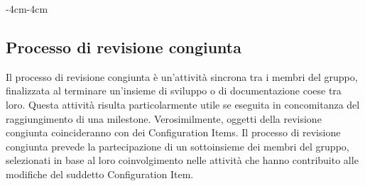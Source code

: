 \documentclass[a4paper,12pt]{article}
\begin{document}
\begin{table}[H]
    \begin{adjustwidth}{-4cm}{-4cm}
        \centering
    \end{adjustwidth}
\end{table}

\subsection{Processo di revisione congiunta}\label{proc_revisione_congiunta}
Il processo di revisione congiunta è un'attività sincrona tra i membri del
gruppo, finalizzata al terminare un'insieme di sviluppo o di documentazione
coese tra loro. Questa attività risulta particolarmente utile se eseguita in
concomitanza del raggiungimento di una milestone. Verosimilmente, oggetti della
revisione congiunta coincideranno con dei Configuration Items. Il processo di
revisione congiunta prevede la partecipazione di un sottoinsieme dei membri del
gruppo, selezionati in base al loro coinvolgimento nelle attività che hanno
contribuito alle modifiche del suddetto Configuration Item.
\end{document}
